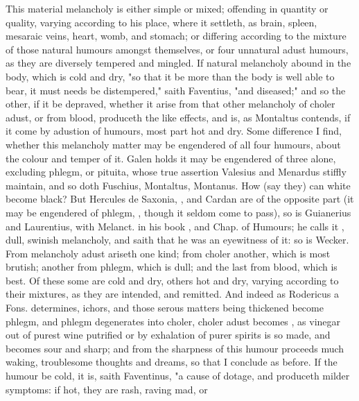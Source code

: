 This material melancholy is either simple or mixed; offending in quantity or
quality, varying according to his place, where it settleth, as brain, spleen,
mesaraic veins, heart, womb, and stomach; or differing according to the mixture
of those natural humours amongst themselves, or four unnatural adust humours,
as they are diversely tempered and mingled. If natural melancholy abound in the
body, which is cold and dry, "so that it be more than the
body is well able to bear, it must needs be distempered," saith Faventius, "and
diseased;" and so the other, if it be depraved, whether it arise from that
other melancholy of choler adust, or from blood, produceth the like effects,
and is, as Montaltus contends, if it come by adustion of humours, most part hot
and dry. Some difference I find, whether this melancholy matter may be
engendered of all four humours, about the colour and temper of it. Galen holds
it may be engendered of three alone, excluding phlegm, or pituita, whose true
assertion Valesius and Menardus stiffly maintain, and so
doth Fuschius, Montaltus, Montanus.
How (say they) can white become black? But Hercules de Saxonia,
, and
Cardan are of the opposite part (it may be engendered of
phlegm, , though it seldom come to pass), so is
Guianerius and Laurentius, 
with Melanct. in his book , and Chap. of
Humours; he calls it , dull, swinish melancholy, and saith that he
was an eyewitness of it: so is Wecker. From melancholy
adust ariseth one kind; from choler another, which is most brutish; another
from phlegm, which is dull; and the last from blood, which is best. Of these
some are cold and dry, others hot and dry, varying
according to their mixtures, as they are intended, and remitted. And indeed as
Rodericus a Fons.  determines, ichors,
and those serous matters being thickened become phlegm, and phlegm degenerates
into choler, choler adust becomes , as vinegar out
of purest wine putrified or by exhalation of purer spirits is so made, and
becomes sour and sharp; and from the sharpness of this humour proceeds much
waking, troublesome thoughts and dreams, \etc{} so that I conclude as before.
If the humour be cold, it is, saith Faventinus, "a cause
of dotage, and produceth milder symptoms: if hot, they are rash, raving mad, or
